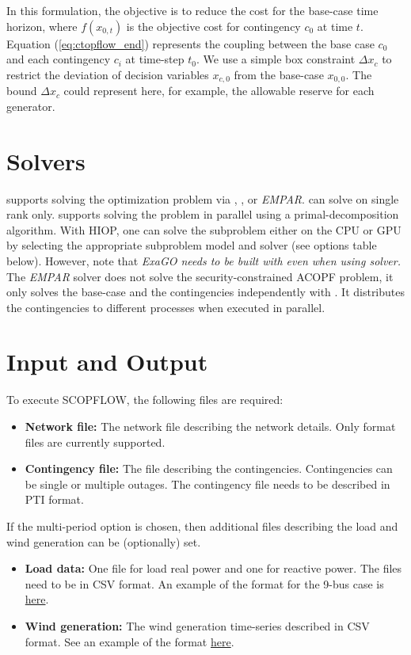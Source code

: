 In this formulation, the objective is to reduce the cost for the base-case time
horizon, where $f(x_{0,t})$ is the objective cost for contingency $c_0$ at time
$t$. Equation (\ref{eq:ctopflow_end}) represents the coupling between the base
case $c_0$ and each contingency $c_i$ at time-step $t_0$. We use a simple box
constraint $\Delta x_c$ to restrict the  deviation of decision variables
$x_{c,0}$ from the base-case $x_{0,0}$. The bound $\Delta x_c$ could represent here, for example, the allowable reserve for each generator.

\section{Solvers}
\scopflow supports solving the optimization problem via \ipopt, \hiop, or \emph{EMPAR}. \ipopt can solve \scopflow on single rank only. \hiop supports solving the problem in parallel using a primal-decomposition algorithm. With HIOP, one can solve the subproblem either on the CPU or GPU by selecting the appropriate subproblem model and solver (see options table below).  However, note that \emph{ExaGO needs to be built with \ipopt even when using \hiop solver.} The \emph{EMPAR} solver does not solve the security-constrained ACOPF problem, it only solves the base-case and the contingencies independently with \opflow. It distributes the contingencies to different processes when executed in parallel.

\section{Input and Output}
To execute SCOPFLOW, the following files are required:
\begin{itemize}
    \item \textbf{Network file:} The network file describing the network details. Only \matpower format files are currently supported.
    \item \textbf{Contingency file:} The file describing the contingencies. Contingencies can be single or multiple outages. The contingency file needs to be described in PTI format.
\end{itemize}
If the multi-period option is chosen, then additional files describing the load and wind generation can be (optionally) set.
\begin{itemize}
    \item \textbf{Load data:} One file for load real power and one for reactive power. The files need to be in CSV format. An example of the format for the 9-bus case is \href{https://gitlab.pnnl.gov/exasgd/frameworks/exago/-/tree/master/datafiles/case9}{here}.
    \item \textbf{Wind generation:} The wind generation time-series described in CSV format. See an example of the format \href{https://gitlab.pnnl.gov/exasgd/frameworks/exago/-/tree/master/datafiles/case9}{here}.
\end{itemize}

